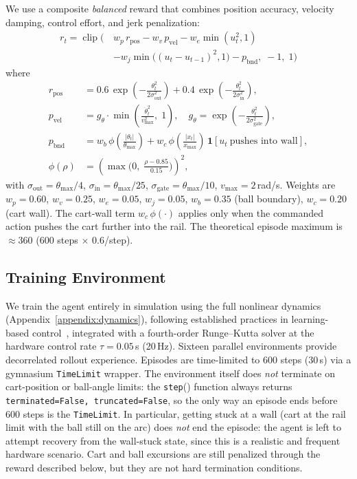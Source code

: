 We use a composite \emph{balanced} reward that combines position accuracy,
velocity damping, control effort, and jerk penalization:
\begin{equation}
\label{eq:reward}
\begin{aligned}
r_t = \operatorname{clip}\Big(\, & w_p\, r_\text{pos} - w_v\, p_\text{vel}
      - w_e \min(u_t^2, 1) \\
      & - w_j \min\big((u_t - u_{t-1})^2, 1\big)
      - p_\text{bnd},\; -1,\; 1 \Big)
\end{aligned}
\end{equation}
where
\begin{align*}
r_\text{pos} &= 0.6\,\exp\!\left(-\frac{\theta_t^2}{2\sigma_\text{out}^2}\right)
             + 0.4\,\exp\!\left(-\frac{\theta_t^2}{2\sigma_\text{in}^2}\right), \\
p_\text{vel} &= g_\theta \cdot \min\!\left(\frac{\dot\theta_t^2}{v_\text{max}^2},\; 1\right), \quad
  g_\theta = \exp\!\left(-\frac{\theta_t^2}{2\sigma_\text{gate}^2}\right), \\
p_\text{bnd} &= w_b\, \phi\!\left(\frac{|\theta_t|}{\theta_\text{max}}\right)
             + w_c\, \phi\!\left(\frac{|x_t|}{x_\text{max}}\right)\,
             \mathbf{1}[u_t\ \text{pushes into wall}], \\
  \phi(\rho) &= \left(\max\!\Big(0,\; \tfrac{\rho - 0.85}{0.15}\Big)\right)^{\!2},
\end{align*}
with $\sigma_\text{out} = \theta_\text{max}/4$, $\sigma_\text{in} = \theta_\text{max}/25$,
$\sigma_\text{gate} = \theta_\text{max}/10$, $v_\text{max} = 2$\,rad/s.
Weights are $w_p{=}0.60$, $w_v{=}0.25$, $w_e{=}0.05$, $w_j{=}0.05$,
$w_b{=}0.35$ (ball boundary), $w_c{=}0.20$ (cart wall). The cart-wall term
$w_c\,\phi(\cdot)$ applies only when the commanded action pushes the cart
further into the rail. The theoretical episode maximum is
$\approx 360$ (600 steps $\times$ 0.6/step).

\subsection{Training Environment}
\label{appendix:training_env}

We train the agent entirely in simulation using the full nonlinear
dynamics (Appendix~\ref{appendix:dynamics}), following established practices in
learning-based control~\cite{hewing2020learning}, integrated with a fourth-order
Runge--Kutta solver at the hardware control rate $\tau = 0.05$\,s (20\,Hz).
Sixteen parallel environments provide decorrelated rollout experience.
Episodes are time-limited to 600 steps (30\,s) via a gymnasium
\texttt{TimeLimit} wrapper. The environment itself does \emph{not}
terminate on cart-position or ball-angle limits: the \texttt{step}()
function always returns \texttt{terminated=False, truncated=False}, so the
only way an episode ends before 600 steps is the \texttt{TimeLimit}. In
particular, getting stuck at a wall (cart at the rail limit with the
ball still on the arc) does \emph{not} end the episode: the agent is
left to attempt recovery from the wall-stuck state, since this is a
realistic and frequent hardware scenario. Cart and ball excursions are
still penalized through the reward described below, but they are not
hard termination conditions.

